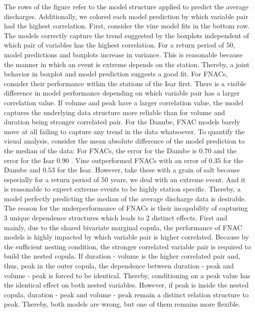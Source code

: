 \documentclass[
]{krantz}
\begin{document}
The rows of the figure refer to the model structure applied to predict the average discharges.
Additionally, we colored each model prediction by which variable pair had the highest correlation.
First, consider the vine model fits in the bottom row. The models
correctly capture the trend suggested by the boxplots independent of which pair of variables has the highest
correlation. For a return period of \(50\), model predictions and boxplots increase in variance.
This is reasonable because the manner in which an event is extreme depends on the station. Thereby, a joint
behavior in boxplot and model prediction suggests a good fit.
For FNACs, consider their performance within the stations of the Isar first. There is a visible
difference in model performance depending on which variable pair has a larger correlation value.
If volume
and peak
have a larger correlation value,
the model captures the underlying data structure more reliable than for
volume and duration being stronger correlated pair.
For the Danube, FNAC models barely move at all failing to capture any trend in the data whatsoever.
To quantify the visual analysis, consider the mean absolute difference of the model prediction to the median
of the data: For FNACs, the error for the Danube is
\(0.70\)
and the error for the Isar
\(0.90\)
.
Vine outperformed FNACs with an error of
\(0.35\)
for the Danube and
\(0.53\)
for the Isar.
However,
take these with a grain of salt because especially for a return period of \(50\) years,
we deal with an extreme event.
And it is reasonable to expect extreme events to be highly station specific.
Thereby, a model perfectly predicting the median of the average discharge data is desirable.\\
The reason for the underperformance of FNACs is their incapability of capturing \(3\) unique dependence structures
which leads to \(2\) distinct effects.
First and mainly, due to the shared bivariate marginal copula, the performance of FNAC models is
highly impacted by which variable pair is higher correlated. Because by the sufficient nesting condition,
the stronger correlated variable pair is required to build the nested copula.
If duration - volume is the higher correlated pair and, thus, peak in the outer copula,
the dependence between duration - peak and volume - peak is forced to be identical. Thereby, conditioning on
a peak value has the identical effect on both nested variables.
However, if peak is inside the nested copula, duration - peak and volume - peak remain a distinct
relation structure to peak. Thereby, both models are wrong, but one of them remains more flexible.
\end{document}
